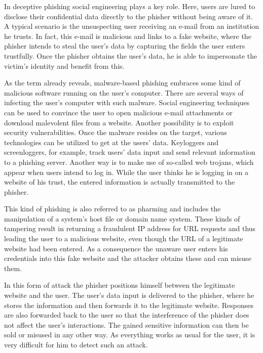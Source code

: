 \begin{description}[leftmargin=0cm]
	\item[Deceptive Phishing] In deceptive phishing social engineering plays a key role. Here, users are lured to disclose their confidential data directly to the phisher without being aware of it. A typical scenario is the unsuspecting user receiving an e-mail from an institution he trusts. In fact, this e-mail is malicious and links to a fake website, where the phisher intends to steal the user's data by capturing the fields the user enters trustfully. Once the phisher obtains the user's data, he is able to impersonate the victim's identity and benefit from this.
	\item[Malware-Based Phishing] As the term already reveals, malware-based phishing embraces some kind of malicious software running on the user's computer. There are several ways of infecting the user's computer with such malware. Social engineering techniques can be used to convince the user to open malicious e-mail attachments or download malevolent files from a website. Another possibility is to exploit security vulnerabilities. Once the malware resides on the target, various technologies can be utilized to get at the users' data. Keyloggers and screenloggers, for example, track users' data input and send relevant information to a phishing server. Another way is to make use of so-called web trojans, which appear when users intend to log in. While the user thinks he is logging in on a website of his trust, the entered information is actually transmitted to the phisher.
	\item[DNS Based Phishing] This kind of phishing is also referred to as pharming and includes the manipulation of a system's host file or domain name system. These kinds of tampering result in returning a fraudulent IP address for URL requests and thus leading the user to a malicious website, even though the URL of a legitimate website had been entered. As a consequence the unaware user enters his credentials into this fake website and the attacker obtains these and can misuse them.
	\item[Man-in-the-Middle Phishing] In this form of attack the phisher positions himself between the legitimate website and the user. The user's data input is delivered to the phisher, where he stores the information and then forwards it to the legitimate website. Responses are also forwarded back to the user so that the interference of the phisher does not affect the user's interactions. The gained sensitive information can then be sold or misused in any other way. As everything works as usual for the user, it is very difficult for him to detect such an attack. 

\end{description}

